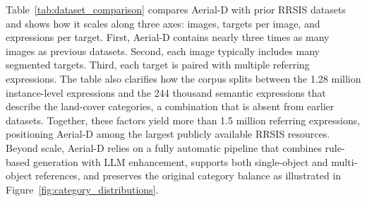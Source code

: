 \documentclass[journal]{IEEEtran}
\begin{document}
Table~\ref{tab:dataset_comparison} compares Aerial-D with prior RRSIS datasets and shows how it scales along three axes: images, targets per image, and expressions per target. First, Aerial-D contains nearly three times as many images as previous datasets. Second, each image typically includes many segmented targets. Third, each target is paired with multiple referring expressions. The table also clarifies how the corpus splits between the 1.28 million instance-level expressions and the 244 thousand semantic expressions that describe the land-cover categories, a combination that is absent from earlier datasets. Together, these factors yield more than 1.5 million referring expressions, positioning Aerial-D among the largest publicly available RRSIS resources. Beyond scale, Aerial-D relies on a fully automatic pipeline that combines rule-based generation with LLM enhancement, supports both single-object and multi-object references, and preserves the original category balance as illustrated in Figure~\ref{fig:category_distributions}.

\begin{table}[t]
\centering
\caption{Comparison with Existing RRSIS Datasets}
\label{tab:dataset_comparison}
\end{table}
\end{document}
